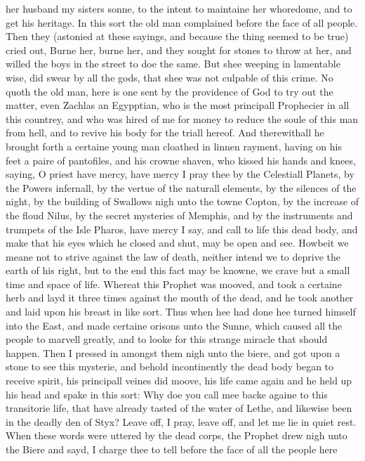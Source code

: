 her husband my sisters sonne, to the intent to maintaine her whoredome, and to
get his heritage. In this sort the old man complained before the face of all
people. Then they (astonied at these sayings, and because the thing seemed to
be true) cried out, Burne her, burne her, and they sought for stones to throw
at her, and willed the boys in the street to doe the same. But shee weeping in
lamentable wise, did swear by all the gods, that shee was not culpable of this
crime. No quoth the old man, here is one sent by the providence of God to try
out the matter, even Zachlas an Egypptian, who is the most principall
Prophecier in all this countrey, and who was hired of me for money to reduce
the soule of this man from hell, and to revive his body for the triall hereof.
And therewithall he brought forth a certaine young man cloathed in linnen
rayment, having on his feet a paire of pantofiles, and his crowne shaven, who
kissed his hands and knees, saying, O priest have mercy, have mercy I pray thee
by the Celestiall Planets, by the Powers infernall, by the vertue of the
naturall elements, by the silences of the night, by the building of Swallows
nigh unto the towne Copton, by the increase of the floud Nilus, by the secret
mysteries of Memphis, and by the instruments and trumpets of the Isle Pharos,
have mercy I say, and call to life this dead body, and make that his eyes which
he closed and shut, may be open and see. Howbeit we meane not to strive against
the law of death, neither intend we to deprive the earth of his right, but to
the end this fact may be knowne, we crave but a small time and space of life.
Whereat this Prophet was mooved, and took a certaine herb and layd it three
times against the mouth of the dead, and he took another and laid upon his
breast in like sort. Thus when hee had done hee turned himself into the East,
and made certaine orisons unto the Sunne, which caused all the people to
marvell greatly, and to looke for this strange miracle that should happen. Then
I pressed in amongst them nigh unto the biere, and got upon a stone to see this
mysterie, and behold incontinently the dead body began to receive spirit, his
principall veines did moove, his life came again and he held up his head and
spake in this sort: Why doe you call mee backe againe to this transitorie life,
that have already tasted of the water of Lethe, and likewise been in the deadly
den of Styx? Leave off, I pray, leave off, and let me lie in quiet rest. When
these words were uttered by the dead corps, the Prophet drew nigh unto the
Biere and sayd, I charge thee to tell before the face of all the people here
